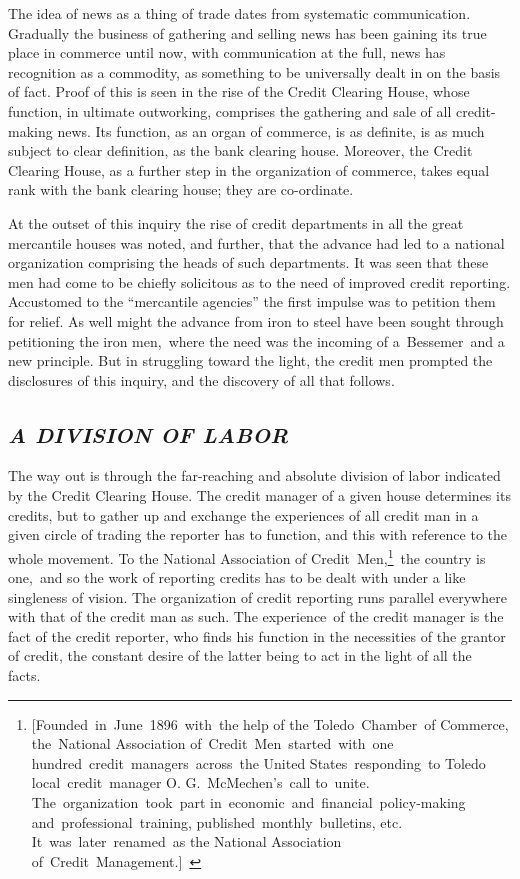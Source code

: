 \documentclass[openany,nobib]{tufte-book}
\begin{document}
The idea of news as a thing of trade dates from systematic
communication. Gradually the business of gathering and selling news has
been gaining its true place in commerce until now, with communication at
the full, news has recognition as a commodity, as something to be
universally dealt in on the basis of fact. Proof of this is seen in the
rise of the Credit Clearing House, whose function, in ultimate
outworking, comprises the gathering and sale of all credit-making news.
Its function, as an organ of commerce, is as definite, is as much
subject to clear definition, as the bank clearing house. Moreover, the
Credit Clearing House, as a further step in the organization of
commerce, takes equal rank with the bank clearing house; they are
co-ordinate.~

At the outset of this inquiry the rise of credit departments in all the
great mercantile houses was noted, and further, that the advance had led
to a national organization comprising the heads of such departments. It
was seen that these men had come to be chiefly solicitous as to the need
of improved credit reporting. Accustomed to the ``mercantile agencies''
the first impulse was to petition them for relief. As well might the
advance from iron to steel have been sought through petitioning the iron
men,~where the need was the incoming of a~Bessemer~and a new principle.
But in struggling toward the light, the credit men prompted the
disclosures of this inquiry, and the discovery of all that follows.~

\hypertarget{a-division-of-labor}{%
\subsection{\texorpdfstring{\emph{A DIVISION OF
LABOR}~}{A DIVISION OF LABOR~}}\label{a-division-of-labor}}

The way out is through the far-reaching and absolute division of labor
indicated by the Credit Clearing House. The credit manager of a given
house determines its credits, but to gather up and exchange the
experiences of all credit man in a given circle of trading the reporter
has to function, and this with reference to the whole movement. To the
National Association of Credit~Men,\footnote{{[}Founded~in~June~1896~with~the
  help of the Toledo~Chamber~of Commerce, the~National Association
  of~Credit~Men~started~with~one hundred~credit~managers~across~the
  United States~responding~to Toledo local~credit~manager O.
  G.~McMechen's~call to~unite. The~organization~took~part
  in~economic~and~financial~policy-making and~professional~training,
  published~monthly~bulletins, etc. It~was~later~renamed~as the National
  Association of~Credit~Management.{]}~}~the country is one,~and so the
work of reporting credits has to be dealt with under a like singleness
of vision. The organization of credit reporting runs parallel everywhere
with that of the credit man as such. The experience~of the credit
manager is the fact of the credit reporter, who finds his function in
the necessities of the grantor of credit, the constant desire of the
latter being to act in the light of all the facts.~
\end{document}
